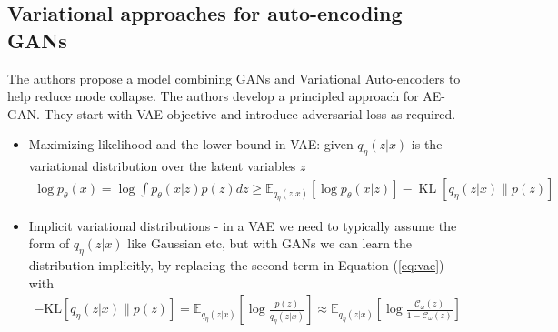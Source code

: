 \subsection*{Variational approaches for auto-encoding GANs \citep{variational}}
The authors propose a model combining GANs and Variational Auto-encoders to help reduce mode collapse. The authors develop a principled approach for AE-GAN. They start with VAE objective and introduce adversarial loss as required.
\begin{itemize}
    \item Maximizing likelihood and the lower bound in VAE: given $q_{\eta}(z | x) $ is the variational distribution over the latent variables $z$
\begin{equation}
    \label{eq:vae}
    \begin{aligned}
    \log p_{\theta}(x)=\log \int p_{\theta}(x | z) p(z) d z 
    \geq \mathbb{E}_{q_{\eta}(z | x)}\left[\log p_{\theta}(x| z)\right]-\operatorname{KL}\left[q_{\eta}(z| x) \| p(z)\right]
    \end{aligned}{}
\end{equation}
\item Implicit variational distributions - in a VAE we need to typically assume the form of $q_{\eta}(z | x) $ like Gaussian etc, but with GANs we can learn the distribution implicitly, by replacing the second term in Equation (\ref{eq:vae}) with
\begin{equation*}
    \begin{aligned}
    -\mathrm{KL}\left[q_{\eta}(z | x) \| p(z)\right]  =\mathbb{E}_{q_{\eta}(z | x)}\left[\log \frac{p(z)}{q_{\eta}(z | x)}\right] 
     \approx \mathbb{E}_{q_{\eta}(z | x)}\left[\log \frac{\mathcal{C}_{\omega}(z)}{1-\mathcal{C}_{\omega}(z)}\right]
    \end{aligned}{}
\end{equation*}{}


\end{itemize}
